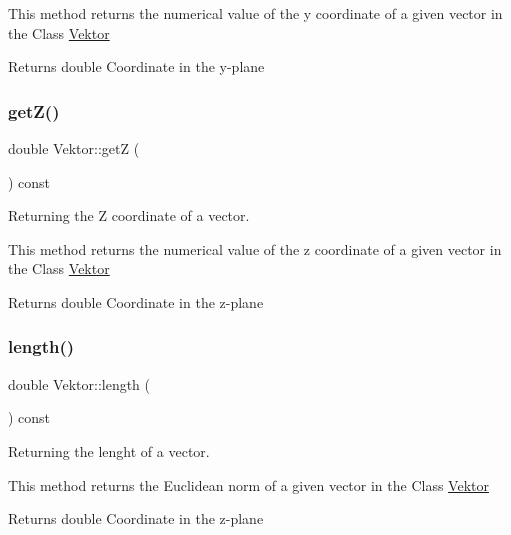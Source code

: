 This method returns the numerical value of the y coordinate of a given vector in the Class \hyperlink{class_vektor}{Vektor}

\begin{DoxyReturn}{Returns}
double Coordinate in the y-\/plane 
\end{DoxyReturn}
\mbox{\label{class_vektor_aaef4681c5b2ce1348685eb4cd89bd9b2}} 
\subsubsection{\texorpdfstring{get\+Z()}{getZ()}}
{\footnotesize\ttfamily double Vektor\+::getZ (\begin{DoxyParamCaption}{ }\end{DoxyParamCaption}) const}



Returning the Z coordinate of a vector. 

This method returns the numerical value of the z coordinate of a given vector in the Class \hyperlink{class_vektor}{Vektor}

\begin{DoxyReturn}{Returns}
double Coordinate in the z-\/plane 
\end{DoxyReturn}
\mbox{\label{class_vektor_aa17fc7f816fc425482b17fdafc45a4ed}} 
\subsubsection{\texorpdfstring{length()}{length()}}
{\footnotesize\ttfamily double Vektor\+::length (\begin{DoxyParamCaption}{ }\end{DoxyParamCaption}) const}



Returning the lenght of a vector. 

This method returns the Euclidean norm of a given vector in the Class \hyperlink{class_vektor}{Vektor}

\begin{DoxyReturn}{Returns}
double Coordinate in the z-\/plane 
\end{DoxyReturn}
\mbox{\label{class_vektor_a4624deedf4290c110ff4cfb756184f39}} 

